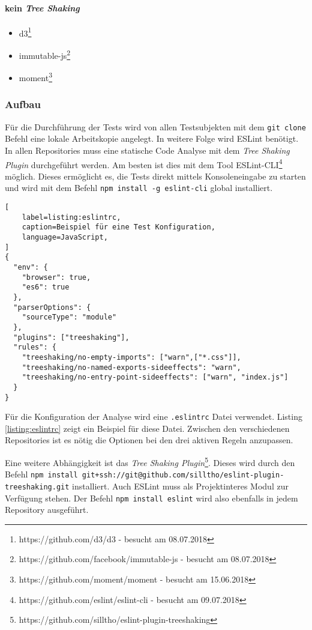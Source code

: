 \paragraph{kein \textit{Tree Shaking}}
\begin{itemize}
\item d3\footnote{https://github.com/d3/d3 - besucht am 08.07.2018}
\item immutable-js\footnote{https://github.com/facebook/immutable-js - besucht am 08.07.2018}
\item moment\footnote{https://github.com/moment/moment - besucht am 15.06.2018}
\end{itemize}

\subsubsection{Aufbau}

Für die Durchführung der Tests wird von allen Testsubjekten mit dem \lstinline{git clone} Befehl eine lokale Arbeitskopie angelegt. In weitere Folge wird ESLint benötigt. In allen Repositories muss eine statische Code Analyse mit dem \textit{Tree Shaking Plugin} durchgeführt werden. Am besten ist dies mit dem Tool  ESLint-CLI\footnote{https://github.com/eslint/eslint-cli - besucht am 09.07.2018} möglich. Dieses ermöglicht es, die Tests direkt mittels Konsoleneingabe zu starten und wird mit dem Befehl \lstinline{npm install -g eslint-cli} global installiert.

\begin{lstlisting}[
    label=listing:eslintrc,
	caption=Beispiel für eine Test Konfiguration,
	language=JavaScript,
]
{
  "env": {
    "browser": true,
    "es6": true
  },
  "parserOptions": {
    "sourceType": "module"
  },
  "plugins": ["treeshaking"],
  "rules": {
    "treeshaking/no-empty-imports": ["warn",["*.css"]],
    "treeshaking/no-named-exports-sideeffects": "warn",
    "treeshaking/no-entry-point-sideeffects": ["warn", "index.js"]
  }
}
\end{lstlisting}

Für die Konfiguration der Analyse wird eine \lstinline{.eslintrc} Datei verwendet. Listing \ref{listing:eslintrc} zeigt ein Beispiel für diese Datei. Zwischen den verschiedenen Repositories ist es nötig die Optionen bei den drei aktiven Regeln anzupassen.

Eine weitere Abhängigkeit ist das \textit{Tree Shaking Plugin}\footnote{https://github.com/silltho/eslint-plugin-treeshaking}. Dieses wird durch den Befehl \lstinline{npm install git+ssh://git@github.com/silltho/eslint-plugin-treeshaking.git} installiert. Auch ESLint muss als Projektinteres Modul zur Verfügung stehen. Der Befehl \lstinline{npm install eslint} wird also ebenfalls in jedem Repository ausgeführt.

